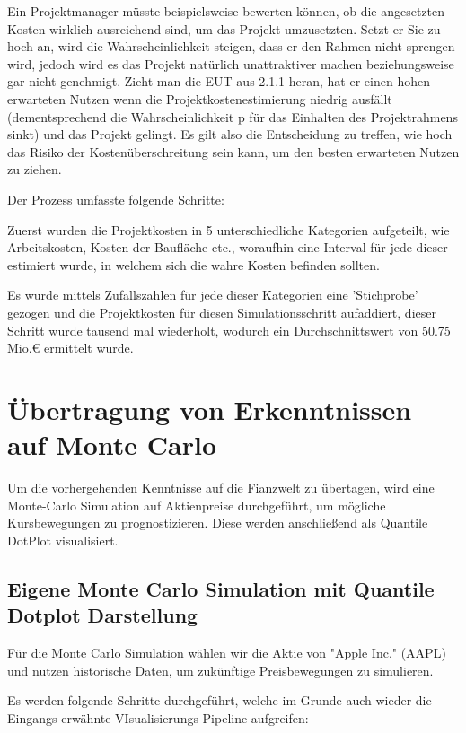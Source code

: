 Ein Projektmanager müsste beispielsweise bewerten können, ob die angesetzten Kosten wirklich ausreichend sind, um das Projekt umzusetzten.
Setzt er Sie zu hoch an, wird die Wahrscheinlichkeit steigen, dass er den Rahmen nicht sprengen wird, jedoch wird es das Projekt natürlich unattraktiver
machen beziehungsweise gar nicht genehmigt. Zieht man die \ac{EUT} aus 2.1.1 heran, hat er einen hohen erwarteten Nutzen wenn die Projektkostenestimierung niedrig ausfällt
(dementsprechend die Wahrscheinlichkeit p für das Einhalten des Projektrahmens sinkt) und das Projekt gelingt. Es gilt also die Entscheidung zu treffen, wie hoch das Risiko der Kostenüberschreitung
sein kann, um den besten erwarteten Nutzen zu ziehen.

Der Prozess umfasste folgende Schritte:

Zuerst wurden die Projektkosten in 5 unterschiedliche Kategorien aufgeteilt, wie Arbeitskosten, Kosten der Baufläche etc., woraufhin eine Interval
für jede dieser estimiert wurde, in welchem sich die wahre Kosten befinden sollten.

Es wurde mittels Zufallszahlen für jede dieser Kategorien eine 'Stichprobe' gezogen und die Projektkosten für diesen Simulationsschritt aufaddiert, dieser Schritt wurde
tausend mal wiederholt, wodurch ein Durchschnittswert von 50.75 Mio.€ ermittelt wurde.


\section{Übertragung von Erkenntnissen auf Monte Carlo}
Um die vorhergehenden Kenntnisse auf die Fianzwelt zu übertagen, wird eine Monte-Carlo Simulation auf Aktienpreise durchgeführt, um mögliche Kursbewegungen zu prognostizieren. 
Diese werden anschließend als Quantile DotPlot visualisiert.
\subsection{Eigene Monte Carlo Simulation mit Quantile Dotplot Darstellung}

Für die Monte Carlo Simulation wählen wir die Aktie von "Apple Inc." (AAPL) und nutzen historische Daten, um zukünftige Preisbewegungen zu simulieren.

Es werden folgende Schritte durchgeführt, welche im Grunde auch wieder die Eingangs erwähnte VIsualisierungs-Pipeline aufgreifen:

